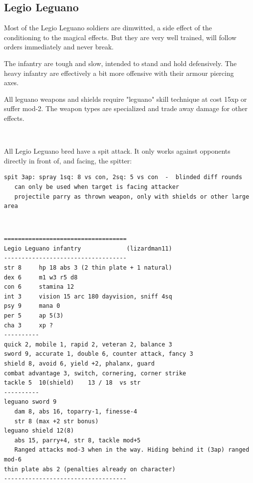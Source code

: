 \clearpage
{}
\subsection*{Legio Leguano}
Most of the Legio Leguano soldiers are dimwitted, a side effect of the conditioning to the magical effects. But they are very well trained, will follow orders immediately and never break.

The infantry are tough and slow, intended to stand and hold defensively. The heavy infantry are effectively a bit more offensive with their armour piercing axes.

All leguano weapons and shields require "leguano" skill technique at cost 15xp or suffer mod-2. The weapon types are specialized and trade away damage for other effects.

\

\noindent
All Legio Leguano bred have a spit attack. It only works against opponents directly in front of, and facing, the spitter:

\small \begin{verbatim}
spit 3ap: spray 1sq: 8 vs con, 2sq: 5 vs con  -  blinded diff rounds
   can only be used when target is facing attacker
   projectile parry as thrown weapon, only with shields or other large area
\end{verbatim} \normalsize


\

\goodbreak
\begin{samepage}
\small \begin{verbatim}
===================================
Legio Leguano infantry             (lizardman11)
-----------------------------------
str 8     hp 18 abs 3 (2 thin plate + 1 natural)
dex 6     m1 w3 r5 d8
con 6     stamina 12
int 3     vision 15 arc 180 dayvision, sniff 4sq
psy 9     mana 0
per 5     ap 5(3)
cha 3     xp ?
----------
quick 2, mobile 1, rapid 2, veteran 2, balance 3
sword 9, accurate 1, double 6, counter attack, fancy 3
shield 8, avoid 6, yield +2, phalanx, guard
combat advantage 3, switch, cornering, corner strike
tackle 5  10(shield)    13 / 18  vs str
----------
leguano sword 9
   dam 8, abs 16, toparry-1, finesse-4
   str 8 (max +2 str bonus)
leguano shield 12(8)
   abs 15, parry+4, str 8, tackle mod+5
   Ranged attacks mod-3 when in the way. Hiding behind it (3ap) ranged mod-6
thin plate abs 2 (penalties already on character)
-----------------------------------
\end{verbatim} \normalsize
\end{samepage}

